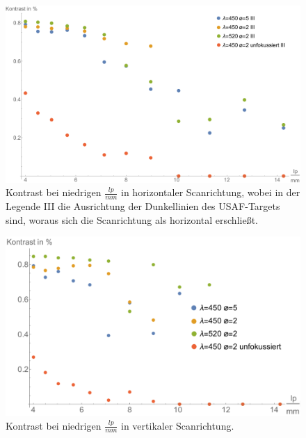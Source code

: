 \begin{figure}[H]
	\centering
\includegraphics[width=1.0\linewidth]{IMAGE/Versuch2Plot1horizontal2.pdf}
	\caption{Kontrast bei niedrigen $\frac{lp}{mm}$ in horizontaler Scanrichtung, wobei in der Legende \glqq III \grqq{} die Ausrichtung der Dunkellinien des USAF-Targets sind, woraus sich die Scanrichtung als horizontal erschließt.
	}
	\label{fig:Versuch2_Plot2h1}
\end{figure} 

\begin{figure}[H]
	\centering
\includegraphics[width=1.0\linewidth]{IMAGE/Versuch2Plot1vertikal2.pdf}
	\caption{Kontrast bei niedrigen $\frac{lp}{mm}$ in vertikaler Scanrichtung.}
	\label{fig:Versuch2_Plot2v1}
\end{figure} 


